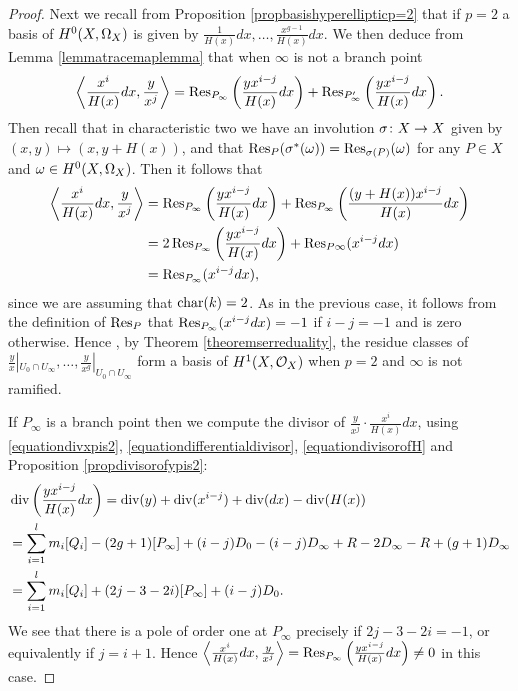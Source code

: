 \begin{proof}
    Next we recall from Proposition \ref{propbasishyperellipticp=2}  that if $p=2$ a basis of ${H^0(X,\Omega_X)}$ is given by $\frac{1}{H(x)}dx, \ldots, \frac{x^{g-1}}{H(x)}dx$.
    We then deduce from Lemma \ref{lemmatracemaplemma} that when $\infty$ is not a branch point
        \[
        \left \langle \frac{x^i}{H(x)}dx, \frac{y}{x^j} \right \rangle = \operatorname{Res}_{P_\infty} \left( \frac{yx^{i-j}}{H(x)}dx \right) + \operatorname{Res}_{P_\infty'}\left( \frac{yx^{i-j}}{H(x)} dx \right).
        \]
    Then recall that in characteristic two we have an involution $\sigma \colon X \rightarrow X$ given by $(x,y) \mapsto (x, y + H(x))$, and that $\operatorname{Res}_P(\sigma^*(\omega)) = \operatorname{Res}_{\sigma(P)}(\omega)$ for any $P \in X$ and $\omega\in {H^0(X,\Omega_X)}$.
    Then it follows that
        \begin{align*}
        \left \langle \frac{x^i}{H(x)}dx, \frac{y}{x^j} \right \rangle & = \operatorname{Res}_{P_ \infty} \left( \frac{yx^{i-j}}{H(x)}dx \right) + \operatorname{Res}_{P_ \infty} \left( \frac{(y+H(x))x^{i-j}}{H(x)}dx \right) \\
        & = 2\operatorname{Res}_{P_\infty}\left( \frac{yx^{i-j}}{H(x)}dx \right) + \operatorname{Res}_{P \infty}(x^{i-j}dx) \\
        & = \operatorname{Res}_{P_\infty}(x^{i-j}dx),
        \end{align*}
    since we are assuming that $\operatorname{char}(k) = 2$.
    As in the previous case, it follows from the definition of $\operatorname{Res}_P$ that $\operatorname{Res}_{P_\infty}(x^{i-j}dx) = -1$ if $i-j = -1$ and is zero otherwise.
    Hence , by Theorem \ref{theoremserreduality}, the residue classes of $\frac{y}{x}|_{U_0 \cap U_\infty}, \ldots, \frac{y}{x^g}|_{U_0 \cap U_\infty}$ form a basis of $H^1(X,\mathcal{O}_X)$ when $p = 2$ and $\infty$ is not ramified.
    
    
    
    If $P_\infty$ is a branch point then we compute the divisor of $ \frac{y}{x^j} \cdot \frac{x^i}{H(x)}dx$, using \eqref{equationdivxpis2}, \eqref{equationdifferentialdivisor}, \eqref{equationdivisorofH} and Proposition \ref{propdivisorofypis2}:
        \begin{align*}
        &\operatorname{div}\left( \frac{yx^{i-j}}{H(x)}dx \right)  = \operatorname{div}(y) + \operatorname{div}(x^{i-j}) + \operatorname{div}( dx) - \operatorname{div}(H(x)) \\
        & = \sum_{i=1}^l m_i[Q_i] - (2g+ 1 )[P_\infty] + (i-j)D_0 - (i-j)D_\infty + R - 2D_\infty  - R + (g+1)D_\infty\\
        & = \sum_{i=1}^l m_i[Q_i] + (2j-3-2i)[P_\infty] + (i-j)D_0.
        \end{align*}
    We see that there is a pole of order one at $P_\infty$ precisely if $2j - 3 - 2i = -1$, or equivalently if $j = i+1$.
    Hence $\left\langle \frac{x^i}{H(x)}dx, \frac{y}{x^j} \right\rangle = \operatorname{Res}_{P_ \infty}\left( \frac{yx^{i-j}}{H(x)}dx\right)  \neq 0$ in this case.
    

\end{proof}
